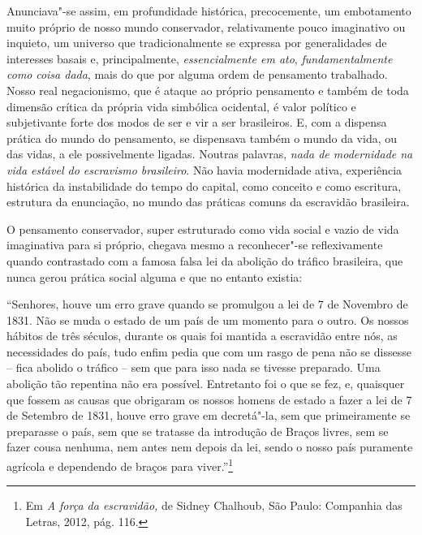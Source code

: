Anunciava"-se assim, em profundidade histórica, precocemente, um
embotamento muito próprio de nosso mundo conservador, relativamente
pouco imaginativo ou inquieto, um universo que tradicionalmente se
expressa por generalidades de interesses basais e, principalmente,
\emph{essencialmente em ato}, \emph{fundamentalmente} \emph{como}
\emph{coisa dada}, mais do que por alguma ordem de pensamento
trabalhado. Nosso real negacionismo, que é ataque ao próprio pensamento
e também de toda dimensão crítica da própria vida simbólica ocidental, é
valor político e subjetivante forte dos modos de ser e vir a ser
brasileiros. E, com a dispensa prática do mundo do pensamento, se
dispensava também o mundo da vida, ou das vidas, a ele possivelmente
ligadas. Noutras palavras, \emph{nada de modernidade na vida estável do
escravismo brasileiro}. Não havia modernidade ativa, experiência
histórica da instabilidade do tempo do capital, como conceito e como
escritura, estrutura da enunciação, no mundo das práticas comuns da
escravidão brasileira.

O pensamento conservador, super estruturado como vida social e vazio de
vida imaginativa para si próprio, chegava mesmo a reconhecer"-se
reflexivamente quando contrastado com a famosa falsa lei da abolição do
tráfico brasileira, que nunca gerou prática social alguma e que no
entanto existia:

``Senhores, houve um erro grave quando se promulgou a lei de 7 de
Novembro de 1831. Não se muda o estado de um país de um momento para o
outro. Os nossos hábitos de três séculos, durante os quais foi mantida a
escravidão entre nós, as necessidades do país, tudo enfim pedia que com
um rasgo de pena não se dissesse -- fica abolido o tráfico -- sem que
para isso nada se tivesse preparado. Uma abolição tão repentina não era
possível. Entretanto foi o que se fez, e, quaisquer que fossem as causas
que obrigaram os nossos homens de estado a fazer a lei de 7 de Setembro
de 1831, houve erro grave em decretá"-la, sem que primeiramente se
preparasse o país, sem que se tratasse da introdução de Braços livres,
sem se fazer cousa nenhuma, nem antes nem depois da lei, sendo o nosso
país puramente agrícola e dependendo de braços para viver.''\footnote{Em
  \emph{A força da escravidão,} de Sidney Chalhoub, São Paulo: Companhia
  das Letras, 2012, pág. 116.}

